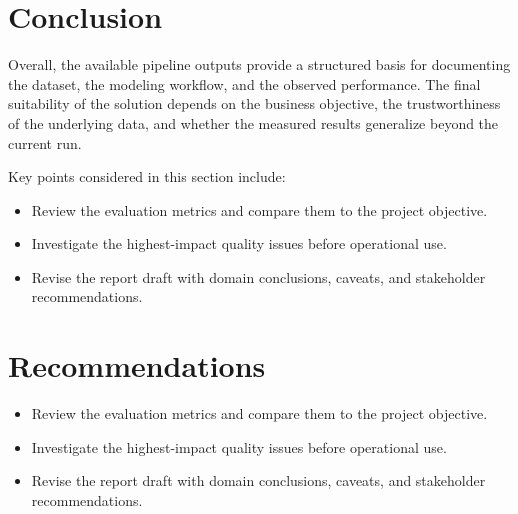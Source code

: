 \documentclass[11pt]{article}
\begin{document}
\section{Conclusion}
Overall, the available pipeline outputs provide a structured basis for documenting the dataset, the modeling workflow, and the observed performance. The final suitability of the solution depends on the business objective, the trustworthiness of the underlying data, and whether the measured results generalize beyond the current run.

Key points considered in this section include:

\begin{itemize}
\item Review the evaluation metrics and compare them to the project objective.
\item Investigate the highest-impact quality issues before operational use.
\item Revise the report draft with domain conclusions, caveats, and stakeholder recommendations.
\end{itemize}


\section{Recommendations}
\begin{itemize}
\item Review the evaluation metrics and compare them to the project objective.
\item Investigate the highest-impact quality issues before operational use.
\item Revise the report draft with domain conclusions, caveats, and stakeholder recommendations.
\end{itemize}
\end{document}
